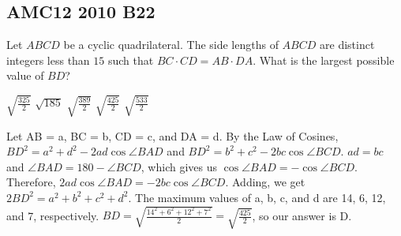\documentclass[12pt]{exam}
\begin{document}
\thispagestyle{empty}

\begin{center}\section*{AMC12 2010 B22}

\end{center}
\bigskip
\begin{questions}

\question 
Let $ABCD$ be a cyclic quadrilateral. 
The side lengths of $ABCD$ are distinct integers less than $15$ such that $BC\cdot CD=AB\cdot DA$. 
What is the largest possible value of $BD$? 
\bigskip

\begin{oneparchoices}
    \choice $\sqrt{\frac{325}{2}}$
    \choice $\sqrt{185}$
    \choice $\sqrt{\frac{389}{2}}$
    \choice $\sqrt{\frac{425}{2}}$
    \choice $\sqrt{\frac{533}{2}}$
\end{oneparchoices}

\vspace{0.5cm}
Let AB = a, BC = b, CD = c, and DA = d. By the Law of Cosines, $BD^2 = a^2 + d^2 - 2ad \cos \angle BAD$
and $BD^2 = b^2 + c^2 - 2bc \cos \angle BCD$. $ad = bc$ and $\angle BAD = 180 - \angle BCD$, which gives us 
$\cos \angle BAD = -\cos \angle BCD$. Therefore, $2ad \cos \angle BAD = -2bc \cos \angle BCD$. Adding, we get 
$2BD^2 = a^2 + b^2 + c^2 + d^2$. The maximum values of a, b, c, and d are 14, 6, 12, and 7, respectively. 
$BD = \sqrt{\frac{14^2 + 6^2 + 12^2 + 7^2}{2}} = \sqrt{\frac{425}{2}}$, so our answer is D.

\end{questions}
\end{document}
